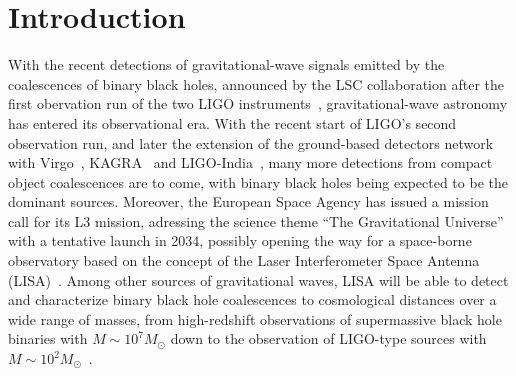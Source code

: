 \documentclass[aps,showpacs,%
prd,superscriptaddress,nofootinbib]{revtex4}
\newcommand{\Msol}{M_{\odot}}
\begin{document}

\section{Introduction}
\label{sec:intro}

With the recent detections of gravitational-wave signals emitted by the coalescences of binary black holes, announced by the LSC collaboration after the first obervation run of the two LIGO instruments~\cite{LIGO-theevent-2016,LIGO-christmasevent-2016,LIGO-O1BBH-2016}, gravitational-wave astronomy has entered its observational era. With the recent start of LIGO's second observation run, and later the extension of the ground-based detectors network with Virgo~\cite{Virgo}, KAGRA~\cite{KAGRA} and LIGO-India~\cite{INDIGO}, many more detections from compact object coalescences are to come, with binary black holes being expected to be the dominant sources. Moreover, the European Space Agency has issued a mission call for its L3 mission, adressing the science theme ``The Gravitational Universe'' with a tentative launch in 2034, possibly opening the way for a space-borne observatory based on the concept of the Laser Interferometer Space Antenna (LISA)~\cite{LISA09}. Among other sources of gravitational waves, LISA will be able to detect and characterize binary black hole coalescences to cosmological distances over a wide range of masses, from high-redshift observations of supermassive black hole binaries with $M\sim 10^{7} \Msol$ down to the observation of LIGO-type sources with $M\sim 10^{2} \Msol$~\cite{Sesana16}.
\end{document}
